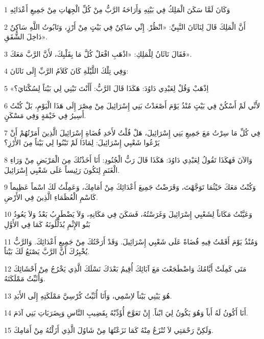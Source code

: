 \par 1 وَكَانَ لَمَّا سَكَنَ الْمَلِكُ فِي بَيْتِهِ وَأَرَاحَهُ الرَّبُّ مِنْ كُلِّ الْجِهَاتِ مِنْ جَمِيعِ أَعْدَائِهِ
\par 2 أَنَّ الْمَلِكَ قَالَ لِنَاثَانَ النَّبِيِّ: «انْظُرْ. إِنِّي سَاكِنٌ فِي بَيْتٍ مِنْ أَرْزٍ، وَتَابُوتُ اللَّهِ سَاكِنٌ دَاخِلَ الشُّقَقِ».
\par 3 فَقَالَ نَاثَانُ لِلْمَلِكِ: «اذْهَبِ افْعَلْ كُلَّ مَا بِقَلْبِكَ، لأَنَّ الرَّبَّ مَعَكَ».
\par 4 وَفِي تِلْكَ اللَّيْلَةِ كَانَ كَلاَمُ الرَّبِّ إِلَى نَاثَانَ:
\par 5 «اِذْهَبْ وَقُلْ لِعَبْدِي دَاوُدَ: هَكَذَا قَالَ الرَّبُّ: أَأَنْتَ تَبْنِي لِي بَيْتاً لِسُكْنَايَ؟
\par 6 لأَنِّي لَمْ أَسْكُنْ فِي بَيْتٍ مُنْذُ يَوْمَ أَصْعَدْتُ بَنِي إِسْرَائِيلَ مِنْ مِصْرَ إِلَى هَذَا الْيَوْمِ، بَلْ كُنْتُ أَسِيرُ فِي خَيْمَةٍ وَفِي مَسْكَنٍ.
\par 7 فِي كُلِّ مَا سِرْتُ مَعَ جَمِيعِ بَنِي إِسْرَائِيلَ، هَلْ قُلْتُ لأَحَدِ قُضَاةِ إِسْرَائِيلَ الَّذِينَ أَمَرْتُهُمْ أَنْ يَرْعُوا شَعْبِي إِسْرَائِيلَ: لِمَاذَا لَمْ تَبْنُوا لِي بَيْتاً مِنَ الأَرْزِ؟
\par 8 وَالآنَ فَهَكَذَا تَقُولُ لِعَبْدِي دَاوُدَ: هَكَذَا قَالَ رَبُّ الْجُنُودِ: أَنَا أَخَذْتُكَ مِنَ الْمَرْبَضِ مِنْ وَرَاءِ الْغَنَمِ لِتَكُونَ رَئِيساً عَلَى شَعْبِي إِسْرَائِيلَ.
\par 9 وَكُنْتُ مَعَكَ حَيْثُمَا تَوَجَّهْتَ، وَقَرَضْتُ جَمِيعَ أَعْدَائِكَ مِنْ أَمَامِكَ، وَعَمِلْتُ لَكَ اسْماً عَظِيماً كَاسْمِ الْعُظَمَاءِ الَّذِينَ فِي الأَرْضِ.
\par 10 وَعَيَّنْتُ مَكَاناً لِشَعْبِي إِسْرَائِيلَ وَغَرَسْتُهُ، فَسَكَنَ فِي مَكَانِهِ، وَلاَ يَضْطَرِبُ بَعْدُ وَلاَ يَعُودُ بَنُو الإِثْمِ يُذَلِّلُونَهُ كَمَا فِي الأَوَّلِ
\par 11 وَمُنْذُ يَوْمَ أَقَمْتُ فِيهِ قُضَاةً عَلَى شَعْبِي إِسْرَائِيلَ. وَقَدْ أَرَحْتُكَ مِنْ جَمِيعِ أَعْدَائِكَ. وَالرَّبُّ يُخْبِرُكَ أَنَّ الرَّبَّ يَصْنَعُ لَكَ بَيْتاً.
\par 12 مَتَى كَمِلَتْ أَيَّامُكَ وَاضْطَجَعْتَ مَعَ آبَائِكَ أُقِيمُ بَعْدَكَ نَسْلَكَ الَّذِي يَخْرُجُ مِنْ أَحْشَائِكَ وَأُثَبِّتُ مَمْلَكَتَهُ.
\par 13 هُوَ يَبْنِي بَيْتاً لاِسْمِي، وَأَنَا أُثَبِّتُ كُرْسِيَّ مَمْلَكَتِهِ إِلَى الأَبَدِ.
\par 14 أَنَا أَكُونُ لَهُ أَباً وَهُوَ يَكُونُ لِيَ ابْناً. إِنْ تَعَوَّجَ أُؤَدِّبْهُ بِقَضِيبِ النَّاسِ وَبِضَرَبَاتِ بَنِي آدَمَ.
\par 15 وَلَكِنَّ رَحْمَتِي لاَ تُنْزَعُ مِنْهُ كَمَا نَزَعْتُهَا مِنْ شَاوُلَ الَّذِي أَزَلْتُهُ مِنْ أَمَامِكَ.
